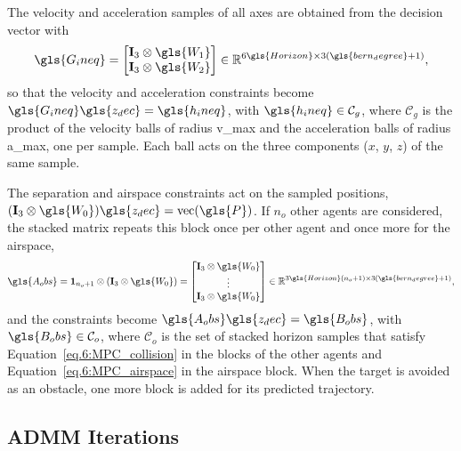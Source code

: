 The velocity and acceleration samples of all axes are obtained from the decision vector with
\begin{equation}
    \gls{G_ineq}=
    \begin{bmatrix}
        \mathbf{I}_3\otimes\gls{W_1}\\
        \mathbf{I}_3\otimes\gls{W_2}
    \end{bmatrix}
    \in\mathbb{R}^{6\gls{Horizon}\times3(\gls{bern_degree}+1)},
    \label{eq:6:G_total}
\end{equation}
so that the velocity and acceleration constraints become $\gls{G_ineq}\gls{z_dec}=\gls{h_ineq}$, with $\gls{h_ineq}\in\mathcal{C}_g$, where $\mathcal{C}_g$ is the product of the velocity balls of radius \gls{v_max} and the acceleration balls of radius \gls{a_max}, one per sample. Each ball acts on the three components ($x$, $y$, $z$) of the same sample.

The separation and airspace constraints act on the sampled positions, $(\mathbf{I}_3\otimes\gls{W_0})\gls{z_dec}=\operatorname{vec}(\gls{P})$. If $n_o$ other agents are considered, the stacked matrix repeats this block once per other agent and once more for the airspace,
\begin{equation}
    \gls{A_obs}
    =
    \mathbf{1}_{n_o+1}\otimes\left(\mathbf{I}_3\otimes\gls{W_0}\right)
    =
    \begin{bmatrix}
        \mathbf{I}_3\otimes\gls{W_0}\\
        \vdots\\
        \mathbf{I}_3\otimes\gls{W_0}
    \end{bmatrix}
    \in\mathbb{R}^{3\gls{Horizon}(n_o+1)\times3(\gls{bern_degree}+1)},
    \label{eq:6:A_obs}
\end{equation}
and the constraints become $\gls{A_obs}\gls{z_dec}=\gls{B_obs}$, with $\gls{B_obs}\in\mathcal{C}_o$, where $\mathcal{C}_o$ is the set of stacked horizon samples that satisfy Equation~\eqref{eq.6:MPC_collision} in the blocks of the other agents and Equation~\eqref{eq.6:MPC_airspace} in the airspace block. When the target is avoided as an obstacle, one more block is added for its predicted trajectory.

\subsection{ADMM Iterations}

